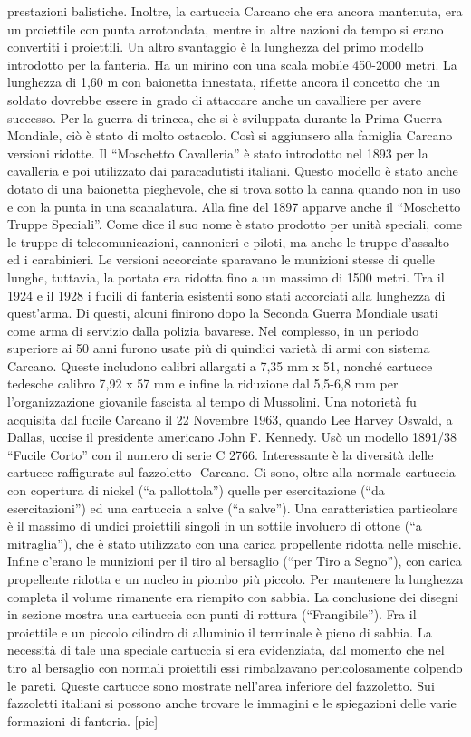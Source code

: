 prestazioni balistiche. Inoltre, la cartuccia Carcano che era ancora
mantenuta, era un proiettile con punta arrotondata, mentre in altre
nazioni da tempo si erano convertiti i proiettili. Un altro svantaggio è
la lunghezza del primo modello introdotto per la fanteria. Ha un mirino
con una scala mobile 450-2000 metri. La lunghezza di 1,60 m con
baionetta innestata, riflette ancora il concetto che un soldato dovrebbe
essere in grado di attaccare anche un cavalliere per avere successo. Per
la guerra di trincea, che si è sviluppata durante la Prima Guerra
Mondiale, ciò è stato di molto ostacolo. Così si aggiunsero alla
famiglia Carcano versioni ridotte. Il ``Moschetto Cavalleria'' è stato
introdotto nel 1893 per la cavalleria e poi utilizzato dai paracadutisti
italiani. Questo modello è stato anche dotato di una baionetta
pieghevole, che si trova sotto la canna quando non in uso e con la punta
in una scanalatura. Alla fine del 1897 apparve anche il ``Moschetto
Truppe Speciali''. Come dice il suo nome è stato prodotto per unità
speciali, come le truppe di telecomunicazioni, cannonieri e piloti, ma
anche le truppe d'assalto ed i carabinieri. Le versioni accorciate
sparavano le munizioni stesse di quelle lunghe, tuttavia, la portata era
ridotta fino a un massimo di 1500 metri. Tra il 1924 e il 1928 i fucili
di fanteria esistenti sono stati accorciati alla lunghezza di
quest'arma. Di questi, alcuni finirono dopo la Seconda Guerra Mondiale
usati come arma di servizio dalla polizia bavarese. Nel complesso, in un
periodo superiore ai 50 anni furono usate più di quindici varietà di
armi con sistema Carcano. Queste includono calibri allargati a 7,35 mm x
51, nonché cartucce tedesche calibro 7,92 x 57 mm e infine la riduzione
dal 5,5-6,8 mm per l'organizzazione giovanile fascista al tempo di
Mussolini. Una notorietà fu acquisita dal fucile Carcano il 22 Novembre
1963, quando Lee Harvey Oswald, a Dallas, uccise il presidente americano
John F. Kennedy. Usò un modello 1891/38 ``Fucile Corto'' con il numero
di serie C 2766. Interessante è la diversità delle cartucce raffigurate
sul fazzoletto- Carcano. Ci sono, oltre alla normale cartuccia con
copertura di nickel (``a pallottola'') quelle per esercitazione (``da
esercitazioni'') ed una cartuccia a salve (``a salve''). Una
caratteristica particolare è il massimo di undici proiettili singoli in
un sottile involucro di ottone (``a mitraglia''), che è stato utilizzato
con una carica propellente ridotta nelle mischie. Infine c'erano le
munizioni per il tiro al bersaglio (``per Tiro a Segno''), con carica
propellente ridotta e un nucleo in piombo più piccolo. Per mantenere la
lunghezza completa il volume rimanente era riempito con sabbia. La
conclusione dei disegni in sezione mostra una cartuccia con punti di
rottura (``Frangibile''). Fra il proiettile e un piccolo cilindro di
alluminio il terminale è pieno di sabbia. La necessità di tale una
speciale cartuccia si era evidenziata, dal momento che nel tiro al
bersaglio con normali proiettili essi rimbalzavano pericolosamente
colpendo le pareti. Queste cartucce sono mostrate nell'area inferiore
del fazzoletto. Sui fazzoletti italiani si possono anche trovare le
immagini e le spiegazioni delle varie formazioni di fanteria. {[}pic{]}

